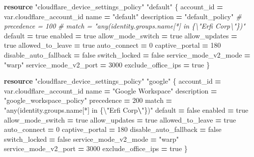 \documentclass[
]{article}
\newenvironment{Shaded}{\begin{snugshade}}{\end{snugshade}}
\newcommand{\CommentTok}[1]{\textcolor[rgb]{0.56,0.35,0.01}{\textit{#1}}}
\newcommand{\DecValTok}[1]{\textcolor[rgb]{0.00,0.00,0.81}{#1}}
\newcommand{\KeywordTok}[1]{\textcolor[rgb]{0.13,0.29,0.53}{\textbf{#1}}}
\newcommand{\NormalTok}[1]{#1}
\newcommand{\OperatorTok}[1]{\textcolor[rgb]{0.81,0.36,0.00}{\textbf{#1}}}
\newcommand{\StringTok}[1]{\textcolor[rgb]{0.31,0.60,0.02}{#1}}
\newcommand{\VariableTok}[1]{\textcolor[rgb]{0.00,0.00,0.00}{#1}}
\begin{document}
\begin{Shaded}
\begin{Highlighting}[numbers=left,,]
\KeywordTok{resource} \StringTok{"cloudflare\_device\_settings\_policy"} \StringTok{"default"}\NormalTok{ \{}
\NormalTok{  account\_id            }\OperatorTok{=} \VariableTok{var}\NormalTok{.cloudflare\_account\_id}
\NormalTok{  name                  }\OperatorTok{=} \StringTok{"default"}
\NormalTok{  description           }\OperatorTok{=} \StringTok{"default\_policy"}
  \CommentTok{\# precedence            = 100}
  \CommentTok{\# match                 = "any(identity.groups.name[*] in \{\textbackslash{}"Erfi Corp\textbackslash{}"\})"}
\NormalTok{  default               }\OperatorTok{=} \VariableTok{true}
\NormalTok{  enabled               }\OperatorTok{=} \VariableTok{true}
\NormalTok{  allow\_mode\_switch     }\OperatorTok{=} \VariableTok{true}
\NormalTok{  allow\_updates         }\OperatorTok{=} \VariableTok{true}
\NormalTok{  allowed\_to\_leave      }\OperatorTok{=} \VariableTok{true}
\NormalTok{  auto\_connect          }\OperatorTok{=} \DecValTok{0}
\NormalTok{  captive\_portal        }\OperatorTok{=} \DecValTok{180}
\NormalTok{  disable\_auto\_fallback }\OperatorTok{=} \VariableTok{false}
\NormalTok{  switch\_locked         }\OperatorTok{=} \VariableTok{false}
\NormalTok{  service\_mode\_v2\_mode  }\OperatorTok{=} \StringTok{"warp"}
\NormalTok{  service\_mode\_v2\_port  }\OperatorTok{=} \DecValTok{3000}
\NormalTok{  exclude\_office\_ips    }\OperatorTok{=} \VariableTok{true}
\NormalTok{\}}
 
\KeywordTok{resource} \StringTok{"cloudflare\_device\_settings\_policy"} \StringTok{"google"}\NormalTok{ \{}
\NormalTok{  account\_id            }\OperatorTok{=} \VariableTok{var}\NormalTok{.cloudflare\_account\_id}
\NormalTok{  name                  }\OperatorTok{=} \StringTok{"Google Workspace"}
\NormalTok{  description           }\OperatorTok{=} \StringTok{"google\_workspace\_policy"}
\NormalTok{  precedence            }\OperatorTok{=} \DecValTok{200}
\NormalTok{  match                 }\OperatorTok{=} \StringTok{"any(identity.groups.name[*] in \{\textbackslash{}"}\NormalTok{Erfi Corp}\OperatorTok{\textbackslash{}}\StringTok{"\})"}
\NormalTok{  default               }\OperatorTok{=} \VariableTok{false}
\NormalTok{  enabled               }\OperatorTok{=} \VariableTok{true}
\NormalTok{  allow\_mode\_switch     }\OperatorTok{=} \VariableTok{true}
\NormalTok{  allow\_updates         }\OperatorTok{=} \VariableTok{true}
\NormalTok{  allowed\_to\_leave      }\OperatorTok{=} \VariableTok{true}
\NormalTok{  auto\_connect          }\OperatorTok{=} \DecValTok{0}
\NormalTok{  captive\_portal        }\OperatorTok{=} \DecValTok{180}
\NormalTok{  disable\_auto\_fallback }\OperatorTok{=} \VariableTok{false}
\NormalTok{  switch\_locked         }\OperatorTok{=} \VariableTok{false}
\NormalTok{  service\_mode\_v2\_mode  }\OperatorTok{=} \StringTok{"warp"}
\NormalTok{  service\_mode\_v2\_port  }\OperatorTok{=} \DecValTok{3000}
\NormalTok{  exclude\_office\_ips    }\OperatorTok{=} \VariableTok{true}
\NormalTok{\}}
\end{Highlighting}
\end{Shaded}
\end{document}
